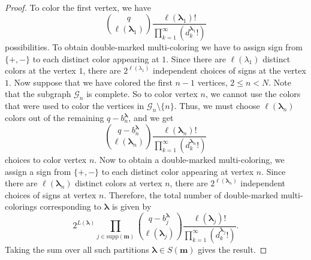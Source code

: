\documentclass[11pt,reqno]{amsart}
\numberwithin{equation}{section} %
\theoremstyle{definition}
\theoremstyle{remark}
\numberwithin{equation}{section}
\begin{document}
\begin{proof}
 To color the first vertex, we have 
     $$\binom{q}{\ell(\boldsymbol{\lambda}_{1})}\frac{\ell(\boldsymbol{\lambda}_{1})!}{\prod_{k=1}^{\infty}(d^{\boldsymbol{\lambda}_{1}}_k!)}$$ possibilities. To obtain double-marked multi-coloring we have to assign sign from $\{+,-\}$ to each distinct color appearing at $1$. Since there are $\ell(\lambda_1)$ distinct colors at the vertex $1$, there are $2^{\ell(\lambda_1)}$ independent choices of signs at the vertex $1.$ %
   Now suppose that we have colored the first $n-1$ vertices, $2\leq n<N$. Note that the subgraph $\mathcal{G}_n$ is complete. So to color vertex $n$, we cannot use the colors that were used to color the vertices in $\mathcal{G}_n \setminus \{n\}$. Thus, we must choose $\ell(\boldsymbol{\lambda}_n)$ colors out of the remaining $q - b^{\boldsymbol{\lambda}}_{n}$, and we get%
   $$\binom{q-b^{\boldsymbol{\lambda}}_{n}}{\ell(\boldsymbol{\lambda}_n)}\frac{\ell(\boldsymbol{\lambda}_n)!}{\prod_{k=1}^{\infty}(d^{\boldsymbol{\lambda}_{n}}_k!)}$$
   choices to color vertex $n$. Now to obtain a double-marked multi-coloring, we assign a sign from $\{+, -\}$ to each distinct color appearing at vertex $n$. Since there are $\ell(\boldsymbol{\lambda}_n)$ distinct colors at vertex $n$, there are $2^{\ell(\boldsymbol{\lambda}_n)}$ independent choices of signs at vertex $n$. Therefore, the total number of double-marked multi-colorings corresponding to $\boldsymbol{\lambda}$ is given by
$$2^{L(\boldsymbol{\lambda})} \prod_{j \in \mathrm{supp}(\mathbf{m})} \binom{q - b^{\boldsymbol{\lambda}}_{j}}{\ell(\boldsymbol{\lambda}_{j})} \frac{\ell(\boldsymbol{\lambda}_{j})!}{\prod_{k=1}^{\infty}(d^{\boldsymbol{\lambda}_{j}}_{k}!)}.$$
Taking the sum over all such partitions $\boldsymbol{\lambda} \in S(\mathbf{m})$ gives the result.



\end{proof}
\end{document}
